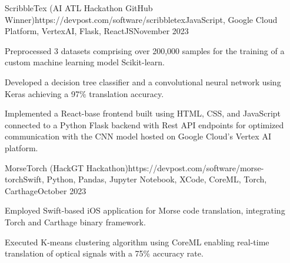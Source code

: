 \documentclass{article}
\begin{document}
\begin{flushleft}
    \begin{project}{ScribbleTex (AI ATL Hackathon GitHub Winner)}{https://devpost.com/software/scribbletex}{JavaScript, Google Cloud Platform, VertexAI, Flask, ReactJS}{November 2023}
        \item Preprocessed 3 datasets comprising over 200,000 samples for the training of a custom machine learning model Scikit-learn.
        \item Developed a decision tree classifier and a convolutional neural network using Keras achieving a 97\% translation accuracy.
        \item Implemented a React-base frontend built using HTML, CSS, and JavaScript connected to a Python Flask backend with Rest API endpoints for optimized communication with the CNN model hosted on Google Cloud's Vertex AI platform.
    \end{project}

    \begin{project}{MorseTorch (HackGT Hackathon)}{https://devpost.com/software/morse-torch}{Swift, Python, Pandas, Jupyter Notebook, XCode, CoreML, Torch, Carthage}{October 2023}
        \item Employed Swift-based iOS application for Morse code translation, integrating Torch and Carthage binary framework.
        \item Executed K-means clustering algorithm using CoreML enabling real-time translation of optical signals with a 75\% accuracy rate.
        
    \end{project}


    \vspace{3pt}
     \\
     \\
    \\
     \\
    

\end{flushleft}
\end{document}
